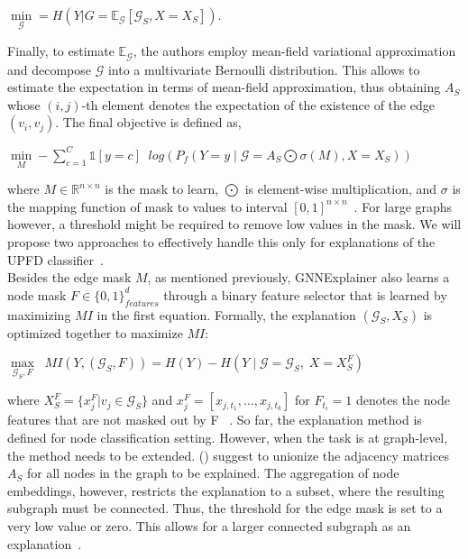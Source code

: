 \begin{center}
    $\min\limits_{\mathcal{G}} = H(Y | G = \mathbb{E}_{\mathcal{G}} [\mathcal{G}_S, X = X_S])$.
\end{center}
Finally, to estimate $\mathbb{E}_{\mathcal{G}}$, the authors employ mean-field variational approximation and decompose $\mathcal{G}$ into a multivariate Bernoulli distribution. This allows to estimate the expectation in terms of mean-field approximation, thus obtaining $A_S$ whose $(i, j)$-th element denotes the expectation of the existence of the edge $(v_i, v_j)$. The final objective is defined as,
\begin{center}
    $\min\limits_M - \sum\limits_{c=1}^C \mathbb{1}[y = c] \;\;log(P_f (Y=y \;|\; \mathcal{G} = A_S \bigodot \sigma(M), X = X_S))$
\end{center}
where $M \in \mathbb{R}^{n \times n}$ is the mask to learn, $\bigodot$ is element-wise multiplication, and $\sigma$ is
the mapping function of mask to values to interval $[0, 1]^{n \times n}$~\parencite{GNNExplainer_Ying}. For large graphs however, a threshold might be required to remove low values in the mask. We will propose two approaches to effectively
handle this only for explanations of the UPFD classifier~\parencite{GNNExplainer_Ying}.\\
Besides the edge mask $M$, as mentioned previously, GNNExplainer also learns a node mask $F \in \{0, 1\}^d_{features}$ through a binary feature selector that is learned by maximizing $MI$ in the first equation. Formally, the explanation $(\mathcal{G}_S, X_S)$ is optimized together to maximize $MI$:
\begin{center}
    $\max\limits_{\mathcal{G}_S, F} \;\; MI (Y, (\mathcal{G}_S, F)) = H(Y) - H(Y \;|\; \mathcal{G} = \mathcal{G}_S,\; X = X_S^F)$
\end{center}
where $X_S^F = \{x_j^F|v_j \in \mathcal{G}_S\}$ and $x_j^F = [x_{j, t_1}, \dots, x_{j, t_k}]$ for
$F_{t_i} = 1$ denotes the node features that are not masked out by F~\parencite{GNNExplainer_Ying} . So far, the
explanation method is defined for node classification setting. However, when the task is at graph-level, the method needs
to be extended. \citeauthor{GNNExplainer_Ying} (\citeyear{GNNExplainer_Ying}) suggest to unionize the adjacency matrices $A_S$ for all nodes in the graph to be explained. The aggregation of node embeddings, however, restricts the explanation to a subset, where the resulting subgraph must be connected. Thus, the threshold for the edge mask is set to a very low value or zero. This allows for a larger connected subgraph as an explanation~\parencite{GNNExplainer_Ying}.\\


